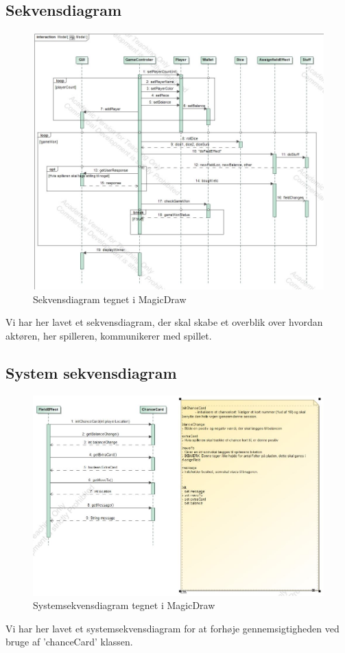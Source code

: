     \subsection{Sekvensdiagram}
        \begin{figure}[h]
            \advance\leftskip-3cm
            \includegraphics[width=18cm]{fig/Sekvensdiagram(1).jpg}
            \caption{Sekvensdiagram tegnet i MagicDraw}
        \end{figure} 
    Vi har her lavet et sekvensdiagram, der skal skabe et overblik over hvordan aktøren, her spilleren,
    kommunikerer med spillet.


    \subsection{System sekvensdiagram}   
        \begin{figure}[h]
            \advance\leftskip-3cm
            \includegraphics[width=20cm]{fig/SSD.jpg}
            \caption{Systemsekvensdiagram tegnet i MagicDraw}
        \end{figure}
    Vi har her lavet et systemsekvensdiagram for at forhøje gennemsigtigheden ved bruge af
    'chanceCard' klassen.
    
